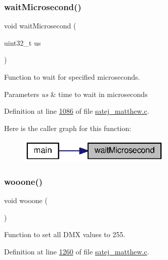 \subsubsection{\texorpdfstring{waitMicrosecond()}{waitMicrosecond()}}
{\footnotesize\ttfamily void wait\+Microsecond (\begin{DoxyParamCaption}\item[{uint32\+\_\+t}]{us }\end{DoxyParamCaption})}



Function to wait for specified microseconds. 


\begin{DoxyParams}{Parameters}
{\em us} & time to wait in microseconds \\
\hline
\end{DoxyParams}


Definition at line \mbox{\hyperlink{satej__matthew_8c_source_l01086}{1086}} of file \mbox{\hyperlink{satej__matthew_8c_source}{satej\+\_\+matthew.\+c}}.

Here is the caller graph for this function\+:
\nopagebreak
\begin{figure}[H]
\begin{center}
\leavevmode
\includegraphics[width=207pt]{satej__matthew_8c_af97018ae05e94f602f956c08ef08c36c_icgraph}
\end{center}
\end{figure}
\mbox{\label{satej__matthew_8c_a35d3aeb4661540f67e367e4e328c6c88}} 
\subsubsection{\texorpdfstring{wooone()}{wooone()}}
{\footnotesize\ttfamily void wooone (\begin{DoxyParamCaption}{ }\end{DoxyParamCaption})}



Function to set all D\+MX values to 255. 



Definition at line \mbox{\hyperlink{satej__matthew_8c_source_l01260}{1260}} of file \mbox{\hyperlink{satej__matthew_8c_source}{satej\+\_\+matthew.\+c}}.

